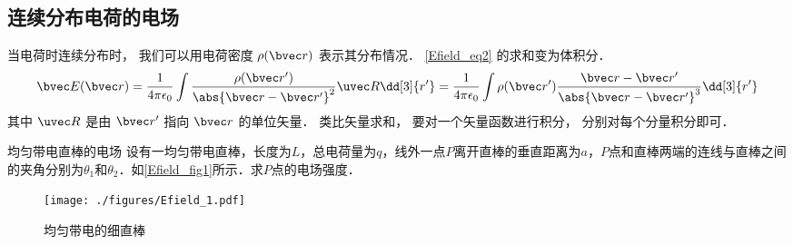 \subsection{连续分布电荷的电场}
当电荷时连续分布时， 我们可以用电荷密度 $\rho(\bvec r)$ 表示其分布情况． \autoref{Efield_eq2} 的求和变为体积分．
\begin{equation}
\bvec E(\bvec r) = \frac{1}{4\pi\epsilon_0} \int \frac{\rho(\bvec r')}{\abs{\bvec r - \bvec r'}^2} \uvec R \dd[3]{r'} = \frac{1}{4\pi\epsilon_0} \int \rho(\bvec r')\frac{\bvec r - \bvec r'}{\abs{\bvec r - \bvec r'}^3} \dd[3]{r'}
\end{equation}
其中 $\uvec R$ 是由 $\bvec r'$ 指向 $\bvec r$ 的单位矢量． 类比矢量求和， 要对一个矢量函数进行积分， 分别对每个分量积分即可．

\begin{example}{均匀带电直棒的电场}\label{Efield_ex1}
设有一均匀带电直棒，长度为$L$，总电荷量为$q$，线外一点$P$离开直棒的垂直距离为$a$，$P$点和直棒两端的连线与直棒之间的夹角分别为$\theta_1$和$\theta_2$．如\autoref{Efield_fig1}所示．求$P$点的电场强度．
\begin{figure}[ht]
\centering
\texttt{[image: ./figures/Efield\_1.pdf]}
\caption{均匀带电的细直棒} \label{Efield_fig1}
\end{figure}


\end{example}
